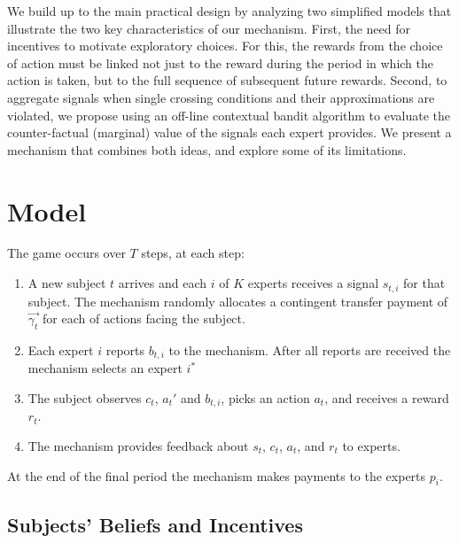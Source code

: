


We build up to the main practical design by analyzing two simplified models that illustrate the two key characteristics of our mechanism. 
First, the need for incentives to motivate exploratory choices.
For this, the rewards from the choice of action must be linked not just to the reward during the period in which the action is taken, but to the full sequence of subsequent future rewards.
Second, to aggregate signals when single crossing conditions and their approximations are violated, we propose using an off-line contextual bandit algorithm to evaluate the counter-factual (marginal) value of the signals each expert provides.
We present a mechanism that combines both ideas, and explore some of its limitations.



\section{Model}

The game occurs over $T$ steps, at each step: 

\begin{enumerate}
\item A new subject $t$ arrives and each $i$ of $K$ experts receives a signal $s_{t,i}$ for that subject. The mechanism  randomly allocates a contingent transfer payment of $\vec{\gamma_t}$ for each of actions facing the subject.
\item Each expert $i$ reports ${b}_{t,i}$ to the mechanism. After all reports are received the mechanism selects an expert $i^{*}$ 
\item The subject observes $c_t$, $a_t'$ and ${b}_{t,i}$, picks an action $a_t$, and receives a reward $r_t$.
\item The mechanism provides feedback about $s_t$, $c_t$, $a_t$, and $r_t$ to experts.
\end{enumerate}

At the end of the final period the mechanism makes payments to the experts $p_i$.


\subsection{Subjects' Beliefs and Incentives}


